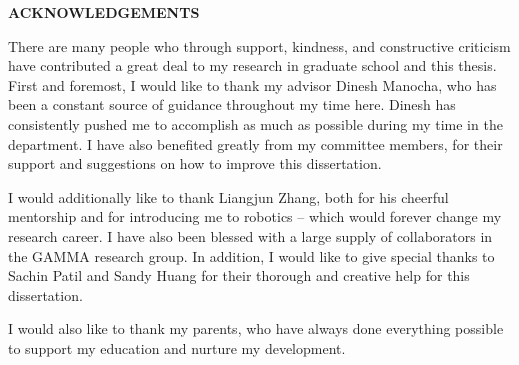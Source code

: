 \begin{center}
\vspace*{52pt}
{\textbf{ACKNOWLEDGEMENTS}}
\end{center}

There are many people who through support, kindness, and constructive criticism have contributed a great deal to my research in graduate school and this thesis. First and foremost, I would like to thank my advisor Dinesh Manocha, who has been a constant source of guidance throughout my time here.  Dinesh has consistently pushed me to accomplish as much as possible during my time in the department. I have also benefited greatly from my committee members, for their support and suggestions on how to improve this dissertation.

I would additionally like to thank Liangjun Zhang, both for his cheerful mentorship and for introducing me to robotics -- which would forever change my research career. I have also been blessed with a large supply of collaborators in the GAMMA research group. In addition, I would like to give special thanks to Sachin Patil and Sandy Huang for their thorough and creative help for this dissertation.

I would also like to thank my parents, who have always done everything possible to support my education and nurture my development.
